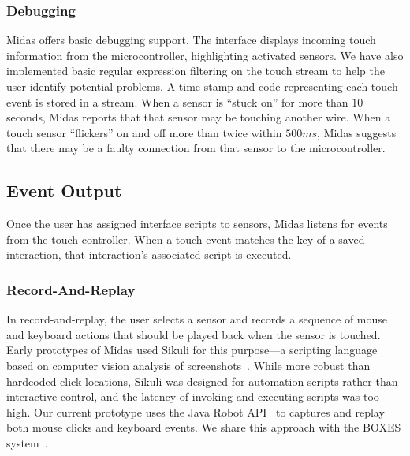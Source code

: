 \subsubsection{Debugging}

Midas offers basic debugging support. The interface displays incoming touch information from the microcontroller, highlighting activated sensors. We have also implemented basic regular expression filtering on the touch stream to help the user identify potential problems. A time-stamp and code representing each touch event is stored in a stream. When a sensor is ``stuck on'' for more than $10$ seconds, Midas reports that that sensor may be touching another wire. When a touch sensor ``flickers'' on and off more than twice within $500ms$, Midas suggests that there may be a faulty connection from that sensor to the microcontroller.

\subsection{Event Output}
Once the user has assigned interface scripts to sensors, Midas listens for events from the touch controller. When a touch event matches the key of a saved interaction, that interaction's associated script is executed.

\subsubsection{Record-And-Replay}

In record-and-replay, the user selects a sensor and records a sequence of mouse and keyboard actions that should be played back when the sensor is touched. Early prototypes of Midas used Sikuli for this purpose---a scripting language based on computer vision analysis of screenshots~\cite{yeh-sikuli}. While more robust than hardcoded click locations, Sikuli was designed for automation scripts rather than interactive control, and the latency of invoking and executing scripts was too high. Our current prototype uses the Java Robot API~\cite{robots} to captures and replay both mouse clicks and keyboard events. We share this approach with the BOXES system~\cite{hudson-boxes}.


